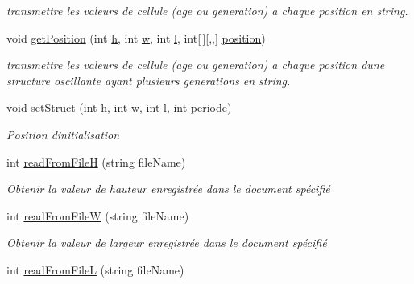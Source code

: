 \begin{DoxyCompactItemize}
\begin{DoxyCompactList}\small\item\em transmettre les valeurs de cellule (age ou generation) a chaque position en string. \end{DoxyCompactList}\item 
void \mbox{\hyperlink{class_local_storage_ab5a516f6f13a01e683b6b1c56b373937}{get\+Position}} (int \mbox{\hyperlink{class_local_storage_ab025e3ab66a812167b739de8f636e72f}{h}}, int \mbox{\hyperlink{class_local_storage_abac4c0cb7803f4f4438aba6a02a9eba2}{w}}, int \mbox{\hyperlink{class_local_storage_a37e93f37b061a398e9d3cbfaf4c7fecd}{l}}, int\mbox{[}$\,$\mbox{]}\mbox{[},,\mbox{]} \mbox{\hyperlink{class_local_storage_a135431eb0ae788b698b206b3cf12130d}{position}})
\begin{DoxyCompactList}\small\item\em transmettre les valeurs de cellule (age ou generation) a chaque position d\textquotesingle{}une structure oscillante ayant plusieurs generations en string. \end{DoxyCompactList}\item 
void \mbox{\hyperlink{class_local_storage_aca462b162e1e7185526f4282a7838f40}{set\+Struct}} (int \mbox{\hyperlink{class_local_storage_ab025e3ab66a812167b739de8f636e72f}{h}}, int \mbox{\hyperlink{class_local_storage_abac4c0cb7803f4f4438aba6a02a9eba2}{w}}, int \mbox{\hyperlink{class_local_storage_a37e93f37b061a398e9d3cbfaf4c7fecd}{l}}, int periode)
\begin{DoxyCompactList}\small\item\em Position d\textquotesingle{}initialisation \end{DoxyCompactList}\item 
int \mbox{\hyperlink{class_local_storage_ab0e31baa14b85dc8a8bd21aa1d53ab09}{read\+From\+FileH}} (string file\+Name)
\begin{DoxyCompactList}\small\item\em Obtenir la valeur de hauteur enregistrée dans le document spécifié \end{DoxyCompactList}\item 
int \mbox{\hyperlink{class_local_storage_aef684ee38f8d4dccf157503ec6d04a7a}{read\+From\+FileW}} (string file\+Name)
\begin{DoxyCompactList}\small\item\em Obtenir la valeur de largeur enregistrée dans le document spécifié \end{DoxyCompactList}\item 
int \mbox{\hyperlink{class_local_storage_a2216bc871c8298023f62119bcdf7edb4}{read\+From\+FileL}} (string file\+Name)

\end{DoxyCompactItemize}
